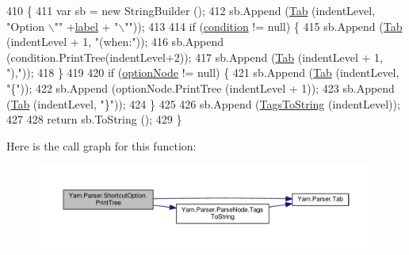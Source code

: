\begin{DoxyCode}
410             \{
411                 var sb = \textcolor{keyword}{new} StringBuilder ();
412                 sb.Append (\hyperlink{a00139_aa8fa36b46de12a1c561d77b99c4b9ae3}{Tab} (indentLevel, \textcolor{stringliteral}{"Option \(\backslash\)""} +\hyperlink{a00149_ab43ec731479a56891389f6ece87f5f62}{label} + \textcolor{stringliteral}{"\(\backslash\)""}));
413 
414                 \textcolor{keywordflow}{if} (\hyperlink{a00149_a31ece7f65af1e43961b68ba0275cdfaf}{condition} != null) \{
415                     sb.Append (\hyperlink{a00139_aa8fa36b46de12a1c561d77b99c4b9ae3}{Tab} (indentLevel + 1, \textcolor{stringliteral}{"(when:"}));
416                     sb.Append (condition.PrintTree(indentLevel+2));
417                     sb.Append (\hyperlink{a00139_aa8fa36b46de12a1c561d77b99c4b9ae3}{Tab} (indentLevel + 1, \textcolor{stringliteral}{"),"}));
418                 \}
419 
420                 \textcolor{keywordflow}{if} (\hyperlink{a00149_a33d667370031f58b054b79a39891c3f3}{optionNode} != null) \{
421                     sb.Append (\hyperlink{a00139_aa8fa36b46de12a1c561d77b99c4b9ae3}{Tab} (indentLevel, \textcolor{stringliteral}{"\{"}));
422                     sb.Append (optionNode.PrintTree (indentLevel + 1));
423                     sb.Append (\hyperlink{a00139_aa8fa36b46de12a1c561d77b99c4b9ae3}{Tab} (indentLevel, \textcolor{stringliteral}{"\}"}));
424                 \}
425 
426                 sb.Append (\hyperlink{a00138_a054f36c80d5eeacd569a8859f599af67}{TagsToString} (indentLevel));
427 
428                 \textcolor{keywordflow}{return} sb.ToString ();
429             \}
\end{DoxyCode}


Here is the call graph for this function\-:
\nopagebreak
\begin{figure}[H]
\begin{center}
\leavevmode
\includegraphics[width=350pt]{a00149_a529a2ef1aa6d7226db4ea7f3ea92b8c2_cgraph}
\end{center}
\end{figure}


